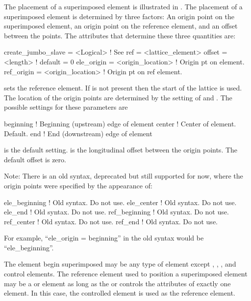 The placement of a superimposed element is illustrated in
. The placement of a superimposed element is
determined by three factors: An origin point on the superimposed
element, an origin point on the reference element, and an offset between
the points. The attributes that determine these three quantities are:
\begin{example}
  create_jumbo_slave = <Logical>     ! See 
  ref          = <lattice_element>
  offset       = <length>            ! default = 0
  ele_origin   = <origin_location>   ! Origin pt on element.
  ref_origin   = <origin_location>   ! Origin pt on ref element.
\end{example}
 sets the reference element. If  is not present then
the start of the lattice is used. The location of the origin points
are determined by the setting of  and .
The possible settings for these parameters are
\begin{example}
  beginning       ! Beginning (upstream) edge of element
  center          ! Center of element. Default.
  end             ! End (downstream) edge of element
\end{example}
 is the default setting.
 is the longitudinal offset
between the origin points. The default offset is zero.

Note: There is an old syntax, deprecated but still supported for now,
where the origin points were specified by the appearance of:
\begin{example}
  ele_beginning         ! Old syntax. Do not use.
  ele_center            ! Old syntax. Do not use.
  ele_end               ! Old syntax. Do not use.
  ref_beginning         ! Old syntax. Do not use.
  ref_center            ! Old syntax. Do not use.
  ref_end               ! Old syntax. Do not use.
\end{example}
For example, ``ele_origin = beginning'' in the old syntax would be ``ele_beginning''.

The element begin superimposed may be any type of element except
, , , and  control
elements. The reference element used to position a superimposed element
may be a  or  element as long as the  or
 controls the attributes of exactly one element. In this case,
the controlled element is used as the reference element.

